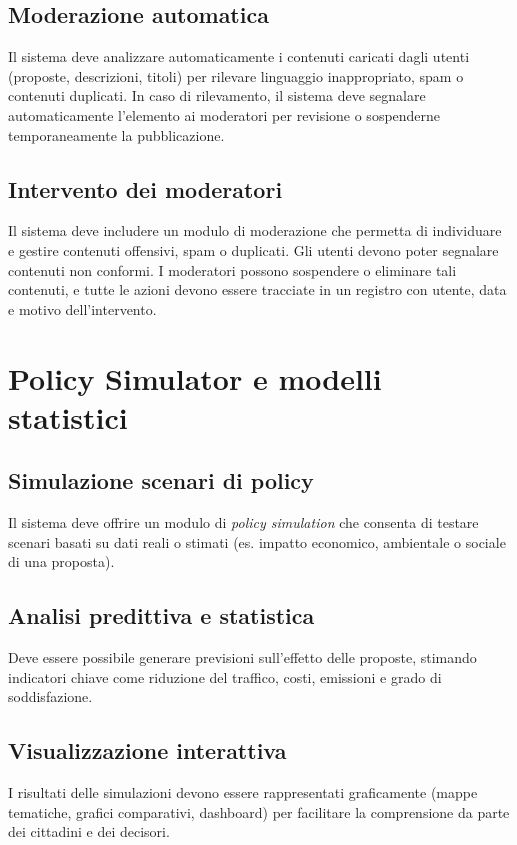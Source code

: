 \subsection{Moderazione automatica}
Il sistema deve analizzare automaticamente i contenuti caricati dagli utenti (proposte, descrizioni, titoli) per rilevare linguaggio inappropriato, spam o contenuti duplicati.
In caso di rilevamento, il sistema deve segnalare automaticamente l’elemento ai moderatori per revisione o sospenderne temporaneamente la pubblicazione.

\subsection{Intervento dei moderatori}
Il sistema deve includere un modulo di moderazione che permetta di individuare e gestire contenuti offensivi, spam o duplicati.  
Gli utenti devono poter segnalare contenuti non conformi.  
I moderatori possono sospendere o eliminare tali contenuti, e tutte le azioni devono essere tracciate in un registro con utente, data e motivo dell’intervento.

\section{Policy Simulator e modelli statistici}

\subsection{Simulazione scenari di policy}
Il sistema deve offrire un modulo di \textit{policy simulation} che consenta di testare scenari basati su dati reali o stimati (es. impatto economico, ambientale o sociale di una proposta).

\subsection{Analisi predittiva e statistica}
Deve essere possibile generare previsioni sull’effetto delle proposte, stimando indicatori chiave come riduzione del traffico, costi, emissioni e grado di soddisfazione.

\subsection{Visualizzazione interattiva}
I risultati delle simulazioni devono essere rappresentati graficamente (mappe tematiche, grafici comparativi, dashboard) per facilitare la comprensione da parte dei cittadini e dei decisori.

